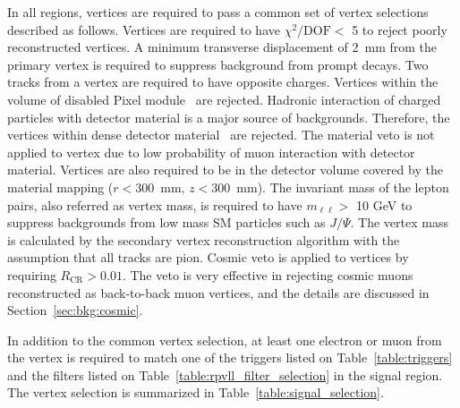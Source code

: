 In all regions, vertices are required to pass a common set of vertex selections described as follows. Vertices are required to have $\chi^2 / \mathrm{ DOF} <$ 5 to reject poorly reconstructed vertices. A minimum transverse displacement of 2~\si{mm} from the primary vertex is required to suppress background from prompt decays. Two tracks from a vertex are required to have opposite charges. Vertices within the volume of disabled Pixel module~\cite{Backhaus:2110260} are rejected. Hadronic interaction of charged particles with detector material is a major source of backgrounds. Therefore, the vertices within dense detector material~\cite{Aaboud:2016poq} are rejected. The material veto is not applied to \mumu vertex due to low probability of muon interaction with detector material. Vertices are also required to be in the detector volume covered by the material mapping ($r < 300$~\si{mm}, $z < 300$~\si{mm}). The invariant mass of the lepton pairs, also referred as vertex mass, is required to have $m_{\ell\ell} >$ 10 GeV to suppress backgrounds from low mass SM particles such as $J/\Psi$. The vertex mass is calculated by the secondary vertex reconstruction algorithm with the assumption that all tracks are pion. Cosmic veto is applied to vertices by requiring $R_{\mathrm{CR}} > 0.01$. The veto is very effective in rejecting cosmic muons reconstructed as back-to-back muon vertices, and the details are discussed in Section~\ref{sec:bkg:cosmic}.

In addition to the common vertex selection, at least one electron or muon from the vertex is required to match one of the triggers listed on Table~\ref{table:triggers} and the filters listed on Table~\ref{table:rpvll_filter_selection} in the signal region. The vertex selection is summarized in Table~\ref{table:signal_selection}.

